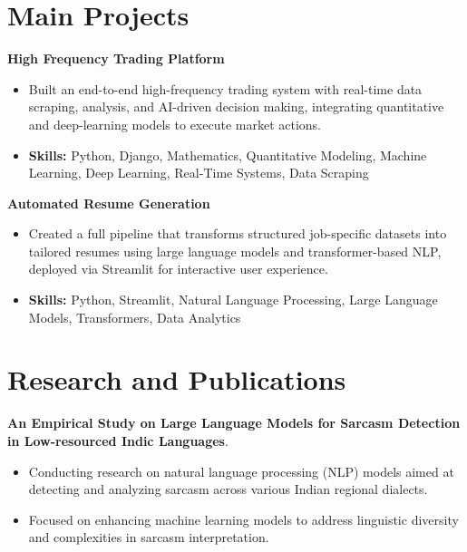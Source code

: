 \documentclass[a4paper,11pt]{article}
\begin{document}
\section{\textbf{Main Projects}}

\vspace{1mm}
  \textbf{High Frequency Trading Platform  }
\vspace{-1.5mm} %
\begin{itemize}
  \item Built an end-to-end high-frequency trading system with real-time data scraping, analysis, and AI-driven decision making, integrating quantitative and deep-learning models to execute market actions.
\vspace{-3mm}
  \item \textbf{Skills:} Python, Django, Mathematics, Quantitative Modeling, Machine Learning, Deep Learning, Real-Time Systems, Data Scraping
\end{itemize}


\vspace{1mm}
   \textbf{Automated Resume Generation }
\vspace{-1.5mm} %
\begin{itemize}
  \item Created a full pipeline that transforms structured job-specific datasets into tailored resumes using large language models and transformer-based NLP, deployed via Streamlit for interactive user experience.
\vspace{-3mm}
  \item \textbf{Skills:} Python, Streamlit, Natural Language Processing, Large Language Models, Transformers, Data Analytics
\end{itemize}



\section{\textbf{Research and Publications} \hfill }
\vspace{1mm}
  \textbf{An Empirical Study on Large Language Models for Sarcasm Detection in Low-resourced Indic Languages}.
\vspace{-1mm} %
\begin{itemize}
  \item Conducting research on natural language processing (NLP) models aimed at detecting and analyzing sarcasm across various Indian regional dialects.
\vspace{-3mm}
  \item Focused on enhancing machine learning models to address linguistic diversity and complexities in sarcasm interpretation.
\end{itemize}
\end{document}
